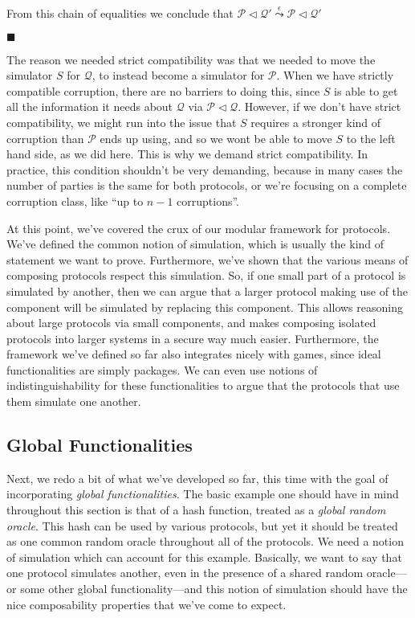 \begin{theorem}
  From this chain of equalities we conclude that
  $\mathscr{P} \lhd \mathscr{Q}' \overset{\epsilon}{\leadsto} \mathscr{P} \lhd \mathscr{Q}'$

  $\blacksquare$
\end{theorem}

The reason we needed strict compatibility was that we needed
to move the simulator $S$ for $\mathscr{Q}$, to instead
become a simulator for $\mathscr{P}$.
When we have strictly compatible corruption, there are no barriers
to doing this, since $S$ is able to get all the information
it needs about $\mathscr{Q}$ via $\mathscr{P} \lhd \mathscr{Q}$.
However, if we don't have strict compatibility,
we might run into the issue that $S$ requires a stronger kind
of corruption than $\mathscr{P}$ ends up using,
and so we wont be able to move $S$ to the left hand side,
as we did here.
This is why we demand strict compatibility.
In practice, this condition shouldn't be very demanding,
because in many cases the number of parties is the same for both protocols,
or we're focusing on a complete corruption class, like ``up to $n - 1$ corruptions''.

At this point, we've covered the crux of our modular framework for protocols.
We've defined the common notion of simulation, which is usually
the kind of statement we want to prove.
Furthermore, we've shown that the various means of composing
protocols respect this simulation.
So, if one small part of a protocol is simulated by another,
then we can argue that a larger protocol making use of the component
will be simulated by replacing this component.
This allows reasoning about large protocols via small components,
and makes composing isolated protocols into larger systems
in a secure way much easier.
Furthermore, the framework we've defined so far
also integrates nicely with games, since ideal functionalities
are simply packages.
We can even use notions of indistinguishability for these functionalities
to argue that the protocols that use them simulate one another.

\subsection{Global Functionalities}

Next, we redo a bit of what we've developed so far, this time
with the goal of incorporating \emph{global functionalities}.
The basic example one should have in mind throughout this section
is that of a hash function, treated as a \emph{global random oracle}.
This hash can be used by various protocols, but yet it should
be treated as one common random oracle throughout all of the protocols.
We need a notion of simulation which can account for this example.
Basically, we want to say that one protocol simulates another,
even in the presence of a shared random oracle---or some other global functionality---and this notion of simulation should have the nice composability properties
that we've come to expect.

